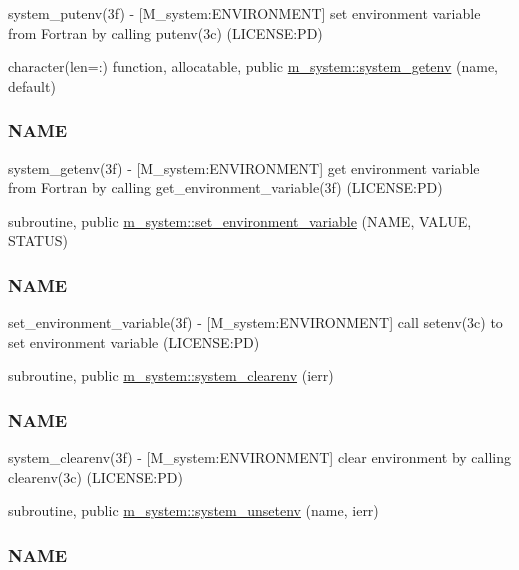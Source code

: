 \begin{DoxyCompactItemize}
\begin{DoxyCompactList}
system\+\_\+putenv(3f) -\/ \mbox{[}M\+\_\+system\+:E\+N\+V\+I\+R\+O\+N\+M\+E\+NT\mbox{]} set environment variable from Fortran by calling putenv(3c) (L\+I\+C\+E\+N\+SE\+:PD) \end{DoxyCompactList}\item 
character(len=\+:) function, allocatable, public \mbox{\hyperlink{namespacem__system_a0f91f973a4288ebda0e75ea0869a43af}{m\+\_\+system\+::system\+\_\+getenv}} (name, default)
\begin{DoxyCompactList}\small\item\em \subsubsection*{N\+A\+ME}

system\+\_\+getenv(3f) -\/ \mbox{[}M\+\_\+system\+:E\+N\+V\+I\+R\+O\+N\+M\+E\+NT\mbox{]} get environment variable from Fortran by calling get\+\_\+environment\+\_\+variable(3f) (L\+I\+C\+E\+N\+SE\+:PD) \end{DoxyCompactList}\item 
subroutine, public \mbox{\hyperlink{namespacem__system_ad813765403a5d9d6fb7a2edcb669fe4b}{m\+\_\+system\+::set\+\_\+environment\+\_\+variable}} (N\+A\+ME, V\+A\+L\+UE, S\+T\+A\+T\+US)
\begin{DoxyCompactList}\small\item\em \subsubsection*{N\+A\+ME}

set\+\_\+environment\+\_\+variable(3f) -\/ \mbox{[}M\+\_\+system\+:E\+N\+V\+I\+R\+O\+N\+M\+E\+NT\mbox{]} call setenv(3c) to set environment variable (L\+I\+C\+E\+N\+SE\+:PD) \end{DoxyCompactList}\item 
subroutine, public \mbox{\hyperlink{namespacem__system_a9c34787b170ab8d41000d7c3acb60736}{m\+\_\+system\+::system\+\_\+clearenv}} (ierr)
\begin{DoxyCompactList}\small\item\em \subsubsection*{N\+A\+ME}

system\+\_\+clearenv(3f) -\/ \mbox{[}M\+\_\+system\+:E\+N\+V\+I\+R\+O\+N\+M\+E\+NT\mbox{]} clear environment by calling clearenv(3c) (L\+I\+C\+E\+N\+SE\+:PD) \end{DoxyCompactList}\item 
subroutine, public \mbox{\hyperlink{namespacem__system_a61b67b46b35490ec308773b65c3376a3}{m\+\_\+system\+::system\+\_\+unsetenv}} (name, ierr)
\begin{DoxyCompactList}\small\item\em \subsubsection*{N\+A\+ME}


\end{DoxyCompactList}
\end{DoxyCompactItemize}
